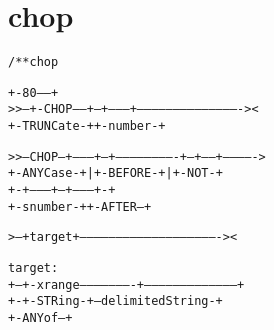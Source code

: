 \section{chop}
\begin{shaded}
\begin{alltt}
/** chop

                     +-80-----+
   >>--+-CHOP-----+--+--------+-------------------------------------------><
       +-TRUNCate-+  +-number-+



   >>--CHOP--+---------+--+-------------------------+--+-----+------------->
             +-ANYCase-+  |              +-BEFORE-+ |  +-NOT-+
                          +-+---------+--+--------+-+
                            +-snumber-+  +-AFTER--+

   >--+ target +----------------------------------------------------------><

   target:
   +--+-xrange----------------------+--------------------------------------+
      +-+-STRing-+--delimitedString-+
        +-ANYof--+


\end{alltt}
\end{shaded}
